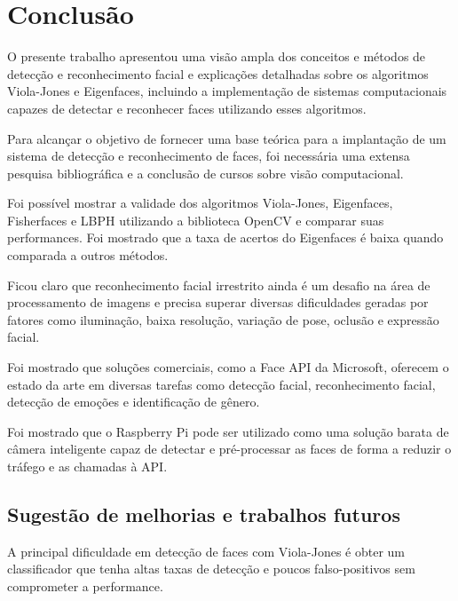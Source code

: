 \chapter*[Conclusão]{Conclusão}

O presente trabalho apresentou uma visão ampla dos conceitos e métodos de detecção e reconhecimento facial e explicações detalhadas sobre os algoritmos Viola-Jones e Eigenfaces, incluindo a implementação de sistemas computacionais capazes de detectar e reconhecer faces utilizando esses algoritmos.

Para alcançar o objetivo de fornecer uma base teórica para a implantação de um sistema de detecção e reconhecimento de faces, foi necessária uma extensa pesquisa bibliográfica e a conclusão de cursos sobre visão computacional.

Foi possível mostrar a validade dos algoritmos Viola-Jones, Eigenfaces, Fisherfaces e LBPH utilizando a biblioteca OpenCV e comparar suas performances. Foi mostrado que a taxa de acertos do Eigenfaces é baixa quando comparada a outros métodos.

Ficou claro que reconhecimento facial irrestrito ainda é um desafio na área de processamento de imagens e precisa superar diversas dificuldades geradas por fatores como iluminação, baixa resolução, variação de pose, oclusão e expressão facial.

Foi mostrado que soluções comerciais, como a Face API da Microsoft, oferecem o estado da arte em diversas tarefas como detecção facial, reconhecimento facial, detecção de emoções e identificação de gênero.

Foi mostrado que o Raspberry Pi pode ser utilizado como uma solução barata de câmera inteligente capaz de detectar e pré-processar as faces de forma a reduzir o tráfego e as chamadas à API.

\section*{Sugestão de melhorias e trabalhos futuros}

A principal dificuldade em detecção de faces com Viola-Jones é obter um classificador que tenha altas taxas de detecção e poucos falso-positivos sem comprometer a performance.


